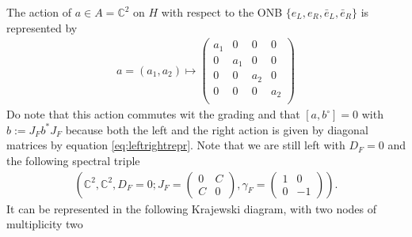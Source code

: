 The action of $a \in A = \mathbb{C}^2$ on $H$ with respect to the ONB
$\{e_L, e_R, \bar{e}_L, \bar{e}_R\}$ is represented by
\begin{align}\label{eq:leftrightrepr}
    a =
    (a_1 , a_2 ) \mapsto
        \begin{pmatrix}
            a_1 &0 &0 &0\\
             0&a_1 &0 &0\\
            0 &0 &a_2 &0\\
            0 &0 &0 &a_2\\
        \end{pmatrix}
\end{align}
Do note that this action commutes wit the grading and that
$[a, b^\circ] = 0$ with $b:= J_F b^*J_F$ because both the left and the right
action is given by diagonal matrices by equation \ref{eq:leftrightrepr}. Note
that we are still left with $D_F = 0$ and the following spectral
triple
\begin{align}\label{eq:fedfail}
        \left( \mathbb{C}^2, \mathbb{C}^2, D_F=0; J_F =
        \begin{pmatrix}
            0 & C \\ C &0
        \end{pmatrix},
        \gamma _F =
        \begin{pmatrix}
            1 & 0 \\ 0 &-1
        \end{pmatrix}
        \right).
    \end{align}
It can be represented in the following Krajewski diagram,
with two nodes of multiplicity two
    \begin{figure}[H] \centering
    \end{figure}
